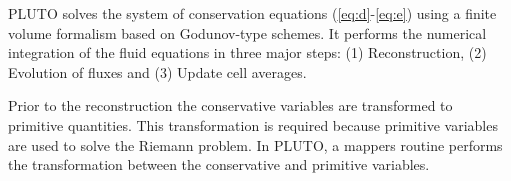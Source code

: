 
%


PLUTO solves the system of conservation equations (\ref{eq:d}-\ref{eq:e}) using a finite volume formalism based on Godunov-type schemes. It performs the numerical integration of the fluid equations in three major steps: (1) Reconstruction, (2) Evolution of fluxes and (3) Update cell averages. 

 
Prior to the reconstruction the conservative variables are transformed to primitive quantities. This transformation is required because primitive variables are used to solve the Riemann problem. In PLUTO, a mappers routine performs the transformation between the conservative and primitive variables. 
 
